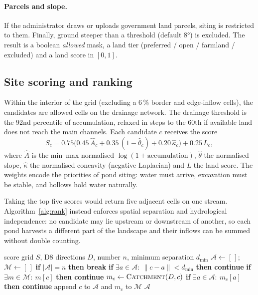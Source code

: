 \documentclass[11pt,a4paper]{article}
\begin{document}
\paragraph{Parcels and slope.} If the administrator draws or uploads government land parcels,
siting is restricted to them. Finally, ground steeper than a threshold (default \ang{8}) is
excluded. The result is a boolean \emph{allowed} mask, a land tier (preferred / open /
farmland / excluded) and a land score in $[0,1]$.

\subsection{Site scoring and ranking}
Within the interior of the grid (excluding a 6\,\% border and edge-inflow cells), the
candidates are allowed cells on the drainage network. The drainage threshold is the 92nd
percentile of accumulation, relaxed in steps to the 60th if available land does not reach the
main channels. Each candidate $c$ receives the score
\begin{equation}
S_c = 0.75\big(0.45\,\hat{A}_c + 0.35\,(1-\hat{\theta}_c) + 0.20\,\hat{\kappa}_c\big) + 0.25\,L_c,
\label{eq:score}
\end{equation}
where $\hat{A}$ is the min--max normalised $\log(1+\text{accumulation})$, $\hat\theta$ the
normalised slope, $\hat\kappa$ the normalised concavity (negative Laplacian) and $L$ the land
score. The weights encode the priorities of pond siting: water must arrive, excavation must be
stable, and hollows hold water naturally.

Taking the top five scores would return five adjacent cells on one stream.
Algorithm~\ref{alg:rank} instead enforces spatial separation and hydrological independence:
no candidate may lie upstream or downstream of another, so each pond harvests a different part
of the landscape and their inflows can be summed without double counting.

\begin{algorithm}[H]
\caption{Ranking independent candidate sites}\label{alg:rank}
\begin{algorithmic}[1]
\Require score grid $S$, D8 directions $D$, number $n$, minimum separation $d_{\min}$
\State $\mathcal{A}\gets[\,]$; $\mathcal{M}\gets[\,]$ 
  \State \textbf{if} $|\mathcal{A}|=n$ \textbf{then break}
  \State \textbf{if} $\exists a\in\mathcal{A}:\ \lVert c-a\rVert<d_{\min}$ \textbf{then continue} 
  \State \textbf{if} $\exists m\in\mathcal{M}:\ m[c]$ \textbf{then continue} 
  \State $m_c\gets\textsc{Catchment}(D,c)$
  \State \textbf{if} $\exists a\in\mathcal{A}:\ m_c[a]$ \textbf{then continue} 
  \State append $c$ to $\mathcal{A}$ and $m_c$ to $\mathcal{M}$
\EndFor
\State \Return $\mathcal{A}$
\end{algorithmic}
\end{algorithm}
\end{document}
